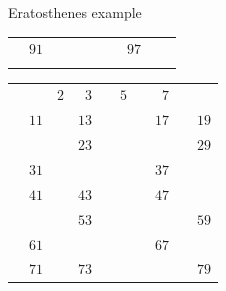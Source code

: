 \documentclass{beamer}
\begin{document}
\begin{frame}[plain]{Eratosthenes example}
{\begin{tabular}{r r r r r r r r r r}
			                   & \color{  red} $91$ &                    &                    &                    &                    &                    & \color{black} $97$ &                    &                   \\
			\phantom{$888$} & \phantom{$888$} & \phantom{$888$} & \phantom{$888$} & \phantom{$888$} & \phantom{$888$} & \phantom{$888$} & \phantom{$888$} & \phantom{$888$} & \phantom{$888$}
        \end{tabular}
	}
	 {
		\begin{tabular}{r r r r r r r r r r}
			                   &                    & \color{black}  $2$ & \color{black}  $3$ &                    & \color{black}  $5$ &                    & \color{ blue}  $7$ &                    &                   \\
			                   & \color{black} $11$ &                    & \color{black} $13$ &                    &                    &                    & \color{black} $17$ &                    & \color{black} $19$\\
			                   &                    &                    & \color{black} $23$ &                    &                    &                    &                    &                    & \color{black} $29$\\
			                   & \color{black} $31$ &                    &                    &                    &                    &                    & \color{black} $37$ &                    &                   \\
			                   & \color{black} $41$ &                    & \color{black} $43$ &                    &                    &                    & \color{black} $47$ &                    &                   \\
			                   &                    &                    & \color{black} $53$ &                    &                    &                    &                    &                    & \color{black} $59$\\
			                   & \color{black} $61$ &                    &                    &                    &                    &                    & \color{black} $67$ &                    &                   \\
			                   & \color{black} $71$ &                    & \color{black} $73$ &                    &                    &                    &                    &                    & \color{black} $79$\\

\end{tabular}}
\end{frame}
\end{document}
